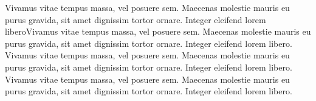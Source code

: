 \documentclass[article]{IEEEtran}
\begin{document}
Vivamus vitae tempus massa, vel posuere sem. Maecenas molestie mauris eu purus gravida, sit amet dignissim tortor ornare. Integer eleifend lorem liberoVivamus vitae tempus massa, vel posuere sem. Maecenas molestie mauris eu purus gravida, sit amet dignissim tortor ornare. Integer eleifend lorem libero.
\\

Vivamus vitae tempus massa, vel posuere sem. Maecenas molestie mauris eu purus gravida, sit amet dignissim tortor ornare. Integer eleifend lorem libero. Vivamus vitae tempus massa, vel posuere sem. Maecenas molestie mauris eu purus gravida, sit amet dignissim tortor ornare. Integer eleifend lorem libero. 
\end{document}
